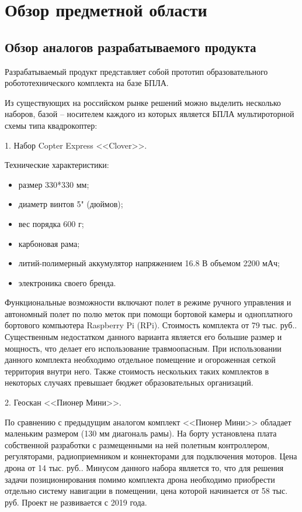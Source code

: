 
\section{Обзор предметной области}

\subsection{Обзор аналогов разрабатываемого продукта}
Разрабатываемый продукт представляет собой прототип образовательного робототехнического комплекта на базе БПЛА.

Из существующих на российском рынке решений можно выделить нес\-колько наборов, базой -- носителем каждого из которых является БПЛА мультироторной схемы типа квадрокоптер:

1. Набор Copter Express <<Clover>>.

Технические характеристики:
\begin{itemize}
	\item размер 330*330 мм;
	\item диаметр винтов 5" (дюймов);
	\item вес порядка 600 г;
	\item карбоновая рама;
	\item литий-полимерный аккумулятор напряжением 16.8 В объемом 2200 мАч;
	\item электроника своего бренда.
\end{itemize}

Функциональные возможности включают полет в режиме ручного управления и автономный полет по полю меток при помощи бортовой камеры и одноплатного бортового компьютера Raspberry Pi (RPi). Стоимость комплекта от 79 тыс. руб.. Существенным недостатком данного варианта является его большие размер и мощность, что делает его использование травмоопасным. При использовании данного комплекта необходимо отдельное помещение и огороженная сеткой территория внутри него. Также стоимость нескольких таких комплектов в некоторых случаях превышает бюджет образовательных организаций.

2. Геоскан <<Пионер Мини>>.

По сравнению с предыдущим аналогом комплект <<Пионер Мини>> обладает маленьким размером (130 мм диагональ рамы). На борту установлена плата собственной разработки с размещенными на ней полетным контроллером, регуляторами, радиоприемником и коннекторами для подключения моторов. Цена дрона от 14 тыс. руб.. Минусом данного набора является то, что для решения задачи позиционирования помимо комплекта дрона необходимо приобрести отдельно систему навигации в помещении, цена которой начинается от 58 тыс. руб. Проект не развивается с 2019 года.

